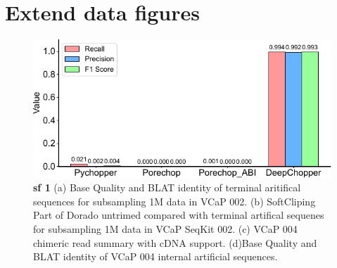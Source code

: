 \documentclass[pdflatex, sn-mathphys-num, lineno]{sn-jnl}%
\theoremstyle{thmstyleone}%
\theoremstyle{thmstyletwo}%
\theoremstyle{thmstylethree}%
\begin{document}




\newpage

\section{Extend data figures}

\renewcommand{\figurename}{Extended Data Fig.}



 \begin{figure}[!h]
     \includegraphics[height=0.65\columnwidth]{figures/finals/sf1}
     \caption{ {\bf  sf 1 } (a) Base Quality and BLAT identity of terminal aritifical sequences for subsampling 1M data in VCaP 002. (b) SoftCliping Part of Dorado untrimed compared with terminal artifical sequenes for subsampling 1M data in VCaP SeqKit 002. (c) VCaP 004 chimeric read summary with cDNA support. (d)Base Quality and BLAT identity of VCaP 004 internal artificial sequences.}
     \label{fig:sf1}
 \end{figure}
\end{document}
